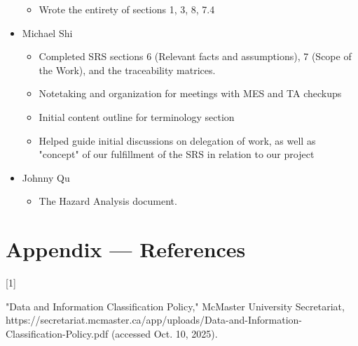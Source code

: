 \documentclass[12pt]{article}
\begin{document}
\begin{itemize}
\begin{itemize}[label=$\circ$]
        \item Wrote the entirety of sections 1, 3, 8, 7.4
      \end{itemize}
    \item Michael Shi
      \begin{itemize}[label=$\circ$]
        \item Completed SRS sections 6 (Relevant facts and assumptions), 7 (Scope of the Work), and the traceability matrices.
        \item Notetaking and organization for meetings with MES and TA checkups
        \item Initial content outline for terminology section
        \item Helped guide initial discussions on delegation of work, as well as "concept" of our fulfillment of the SRS in relation to our project
      \end{itemize}
    \item Johnny Qu
      \begin{itemize}[label=$\circ$]
        \item The Hazard Analysis document. 
      \end{itemize}
  \end{itemize}

\section*{Appendix --- References}
  \hypertarget{Ref1}{[1]} "Data and Information Classification Policy," McMaster University Secretariat, https://secretariat.mcmaster.ca/app/uploads/Data-and-Information-Classification-Policy.pdf (accessed Oct. 10, 2025). \\
\end{document}
